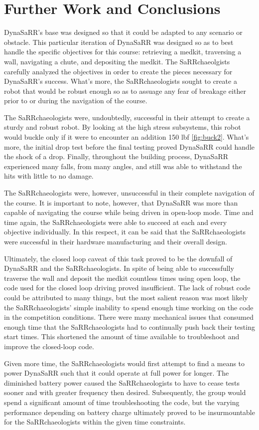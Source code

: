 \section{Further Work and Conclusions}

DynaSaRR's base was designed so that it could be adapted to any scenario or obstacle. This particular iteration of DynaSaRR was designed so as to best handle the specific objectives for this course: retrieving a medkit, traversing a wall, navigating a chute, and depositing  the medkit. The SaRRchaeolgists carefully analyzed the objectives in order to create the pieces necessary for DynaSaRR's success. What's more, the SaRRchaeologists sought to create a robot that would be robust enough so as to assuage any fear of breakage either prior to or during the navigation of the course. 

The SaRRchaeologists were, undoubtedly, successful in their attempt to create a sturdy and robust robot. By looking at the high stress subsystems, this robot would buckle only if it were to encounter an addition 150 lbf \ref{fig:buck2}. What's more, the initial drop test before the final testing proved DynaSaRR could handle the shock of a drop. Finally, throughout the building process, DynaSaRR experienced many falls, from many angles, and still was able to withstand the hits with little to no damage. 

The SaRRchaeologists were, however, unsuccessful in their complete navigation of the course. It is important to note, however, that DynaSaRR was more than capable of navigating the course while being driven in open-loop mode. Time and time again, the SaRRchaeologists were able to succeed at each and every objective individually. In this respect, it can be said that the SaRRchaeologists were successful in their hardware manufacturing and their overall design.

Ultimately, the closed loop caveat of this task proved to be the downfall of DynaSaRR and the SaRRchaeologists. In spite of being able to successfully traverse the wall and deposit the medkit countless times using open loop, the code used for the closed loop driving proved insufficient. The lack of robust code could be attributed to many things, but the most salient reason was most likely the SaRRchaeologists' simple inability to spend enough time working on the code in the competition conditions. There were many mechanical issues that consumed enough time that the SaRRchaeologists had to continually push back their testing start times. This shortened the amount of time available to troubleshoot and improve the closed-loop code.

Given more time, the SaRRchaeologists would first attempt to find a means to power DynaSaRR such that it could operate at full power for longer. The diminished battery power caused the SaRRchaeologists to have to cease tests sooner and with greater frequency then desired. Subsequently, the group would spend a significant amount of time troubleshooting the code, but the varying performance depending on battery charge ultimately proved to be insurmountable for the SaRRchaeologists within the given time constraints. 



